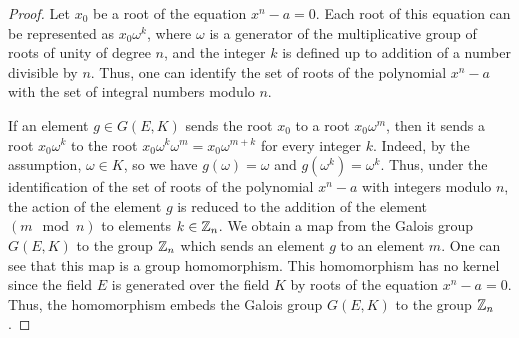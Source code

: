 \documentclass[10pt,a4paper]{amsart}
\begin{document}
\begin{proof} Let $x_0$ be a root of the equation $x^n-a=0$. Each  root of this equation can be represented as $x_0 \omega^k$, where $\omega$ is a generator of the multiplicative group of  roots of unity of degree $n$, and the integer $k$ is defined up to addition of a number divisible by $n$.
Thus, one can identify the set of roots of the polynomial $x^n-a$ with the set of integral numbers modulo $n$.

If an element $g\in G(E,K)$ sends
the root $x_0$ to a root $x_0\omega^m$, then it sends a root $x_0 \omega^k$ to the root $x_0\omega^k \omega^m=x_0\omega^{m+k}$ for every integer $k$.  Indeed, by the assumption,    $\omega\in K$, so  we have  $g(\omega)=\omega$ and $g(\omega^k)=\omega^k$.   Thus, under the identification of the set of roots of the polynomial $x^n-a$ with integers modulo $n$, the  action of the element $g$ is  reduced to the addition of the element  $(m\mod n)$ to elements  $k\in \Bbb Z_n$. We obtain a map from the Galois group $G(E,K)$ to the group $\Bbb Z_n$ which sends an element $g$ to an element $m$. One can see that this map is a group homomorphism. This homomorphism has no kernel since the field $E$ is generated over the field $K$ by roots of the equation $x^n-a=0$.
Thus, the homomorphism embeds the Galois group $G(E,K)$ to the group $\Bbb Z_n$.

\end{proof}
\end{document}
